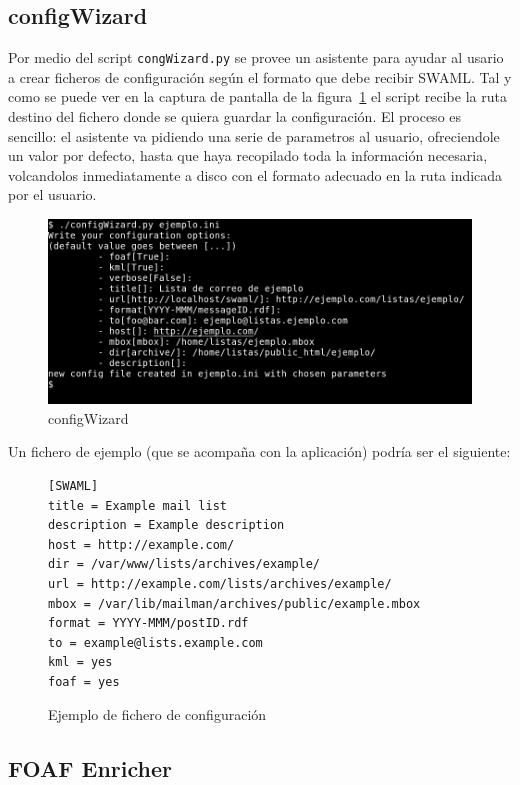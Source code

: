 \subsection*{configWizard}

Por medio del script \texttt{congWizard.py} se provee un asistente para
ayudar al usario a crear ficheros de configuración según el formato
que debe recibir SWAML. Tal y como se puede ver en la captura de pantalla
de la figura~\ref{fig:configWizard} el script recibe la ruta destino del 
fichero donde se quiera guardar la configuración. El proceso es sencillo: 
el asistente va pidiendo una serie de parametros al usuario, ofreciendole
un valor por defecto, hasta que haya recopilado toda la información necesaria,
volcandolos inmediatamente a disco con el formato adecuado en la ruta 
indicada por el usuario.

\begin{figure}[H]
	\centering
	\includegraphics[width=14cm]{images/screenshots/configWizard.png}
	\caption{configWizard}
	\label{fig:configWizard}
\end{figure}

Un fichero de ejemplo (que se acompaña con la aplicación) podría ser el
siguiente:

\begin{figure}[H]
\begin{lstlisting}
[SWAML]
title = Example mail list
description = Example description
host = http://example.com/
dir = /var/www/lists/archives/example/
url = http://example.com/lists/archives/example/
mbox = /var/lib/mailman/archives/public/example.mbox
format = YYYY-MMM/postID.rdf
to = example@lists.example.com
kml = yes
foaf = yes
\end{lstlisting}
\caption{Ejemplo de fichero de configuración}
\label{fig:ejemplo-config}
\end{figure}

\subsection*{FOAF Enricher}

